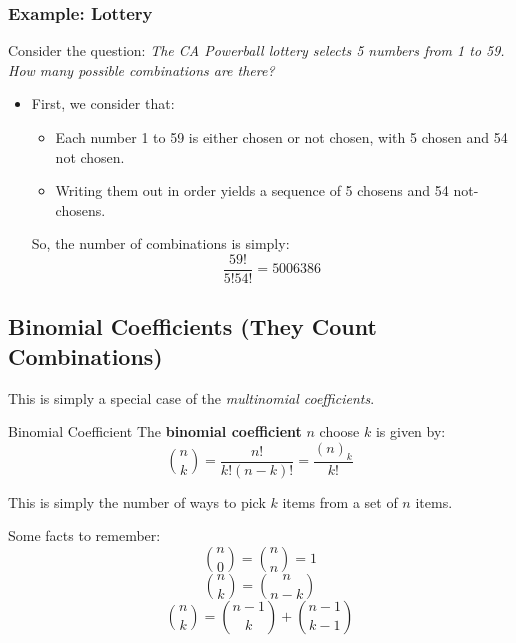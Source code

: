 \documentclass[letterpaper]{article}
\begin{document}
\subsubsection{Example: Lottery}
Consider the question: \emph{The CA Powerball lottery selects 5 numbers from 1 to 59. How many possible combinations are there?}

\begin{itemize}
    \item First, we consider that:
    \begin{itemize}
        \item Each number 1 to 59 is either chosen or not chosen, with 5 chosen and 54 not chosen.
        \item Writing them out in order yields a sequence of 5 chosens and 54 not-chosens.
    \end{itemize}
    So, the number of combinations is simply:
    \[ \frac{59!}{5!54!} = \boxed{5006386} \]
    
\end{itemize}

\subsection{Binomial Coefficients (They Count Combinations)}
This is simply a special case of the \emph{multinomial coefficients}.
\begin{definition}{Binomial Coefficient}{}
    The \textbf{binomial coefficient} $n$ choose $k$ is given by:
    \[\binom{n}{k} = \frac{n!}{k!(n - k)!} = \frac{(n)_k}{k!}\]
\end{definition}
This is simply the number of ways to pick $k$ items from a set of $n$ items.

\bigskip 

Some facts to remember: 
\[\binom{n}{0} = \binom{n}{n} = 1\]
\[\binom{n}{k} = \binom{n}{n - k}\]
\[\binom{n}{k} = \binom{n - 1}{k} + \binom{n - 1}{k - 1}\]
\end{document}
